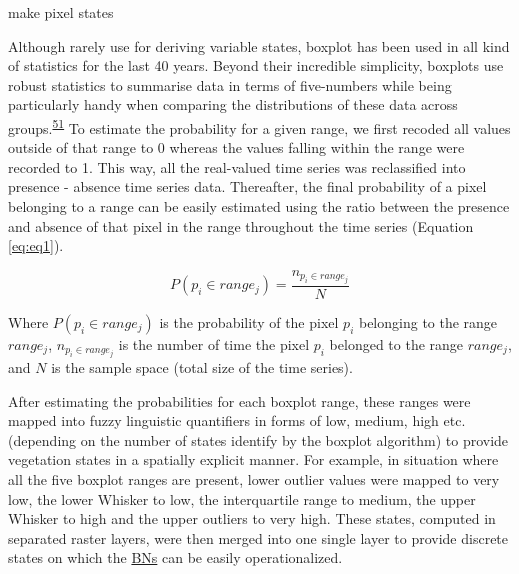 \documentclass[12pt,oneside]{article}
\begin{document}
\begin{algorithm}[H]
\DontPrintSemicolon
\SetAlgoLined
{}
\BlankLine
{}
\caption{make pixel states}
\end{algorithm}

Although rarely use for deriving variable states, boxplot has been used in all kind of statistics for the last 40 years. Beyond their incredible simplicity, boxplots use robust statistics to summarise data in terms of five-numbers while being particularly handy when comparing the distributions of these data across groups.\textsuperscript{\protect\hyperlink{ref-Wickham_and_Stryjewski_2012}{51}} To estimate the probability for a given range, we first recoded all values outside of that range to 0 whereas the values falling within the range were recorded to 1. This way, all the real-valued time series was reclassified into presence - absence time series data. Thereafter, the final probability of a pixel belonging to a range can be easily estimated using the ratio between the presence and absence of that pixel in the range throughout the time series (Equation \eqref{eq:eq1}).

\begin{equation} 
P(p_i \in range_j) = \frac{n_{p_i \in range_j}}{N}
\label{eq:eq1}
\end{equation}

Where \(P(p_i \in range_j)\) is the probability of the pixel \(p_i\) belonging to the range \(range_j\), \(n_{p_i \in range_j}\) is the number of time the pixel \(p_i\) belonged to the range \(range_j\), and \(N\) is the sample space (total size of the time series).

After estimating the probabilities for each boxplot range, these ranges were mapped into fuzzy linguistic quantifiers in forms of low, medium, high etc. (depending on the number of states identify by the boxplot algorithm) to provide vegetation states in a spatially explicit manner. For example, in situation where all the five boxplot ranges are present, lower outlier values were mapped to very low, the lower Whisker to low, the interquartile range to medium, the upper Whisker to high and the upper outliers to very high. These states, computed in separated raster layers, were then merged into one single layer to provide discrete states on which the \href{https://en.wikipedia.org/wiki/Bayesian_network}{BNs} can be easily operationalized.
\end{document}
